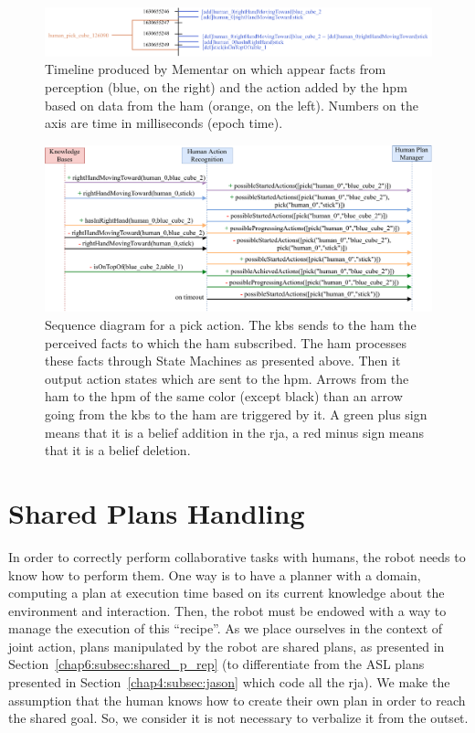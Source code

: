 \documentclass[a4paper,11pt,twoside]{StyleThese}
\begin{document}
\begin{landscape}
	\begin{figure}[!htb]
		\centering
		\includegraphics[width=0.9\linewidth]{figures/chapter2/action_reco_1.pdf}
		\caption{Timeline produced by Mementar on which appear facts from perception (blue, on the right) and the action added by the \acrlong{hpm} based on data from the \acrlong{ham} (orange, on the left). Numbers on the axis are time in milliseconds (epoch time).}
		\label{chap6:fig:action_reco_ex1_timeline}
	\end{figure}
	
	\begin{figure}[!htb]
		\centering
		\includegraphics[width=0.75\linewidth]{figures/chapter2/action_monitoring_ex1.pdf}
		\caption{Sequence diagram for a pick action. The \acrshort{kb}s sends to the \acrshort{ham} the perceived facts to which the \acrshort{ham} subscribed. The \acrshort{ham} processes these facts through State Machines as presented above. Then it output action states which are sent to the \acrfull{hpm}. Arrows from the \acrshort{ham} to the \acrshort{hpm} of the same color (except black) than an arrow going from the \acrshort{kb}s to the \acrshort{ham} are triggered by it. A green plus sign means that it is a belief addition in the \acrshort{rja}, a red minus sign means that it is a belief deletion.}
		\label{chap6:fig:action_reco_ex1}
	\end{figure}
\end{landscape}
\restoregeometry

\section{Shared Plans Handling}\label{chap6:sec:plan_handling}
In order to correctly perform collaborative tasks with humans, the robot needs to know how to perform them. One way is to have a planner with a domain, computing a plan at execution time based on its current knowledge about the environment and interaction. Then, the robot must be endowed with a way to manage the execution of this ``recipe''. As we place ourselves in the context of joint action, plans manipulated by the robot are shared plans, as presented in Section~\ref{chap6:subsec:shared_p_rep} (to differentiate from the ASL plans presented in Section~\ref{chap4:subsec:jason} which code all the \acrshort{rja}). We make the assumption that the human knows how to create their own plan in order to reach the shared goal. So, we consider it is not necessary to verbalize it from the outset.
\end{document}
